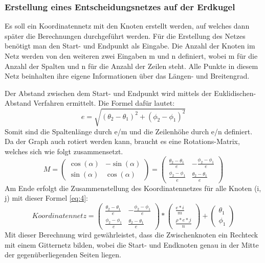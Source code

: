 \subsubsection{Erstellung eines Entscheidungsnetzes auf der Erdkugel}
Es soll ein Koordinatennetz mit den Knoten erstellt werden, auf welches dann später die Berechnungen durchgeführt werden. Für die Erstellung des Netzes benötigt man den Start- und Endpunkt als Eingabe. Die Anzahl der Knoten im Netz werden von den weiteren zwei Eingaben m und n definiert, wobei m für die Anzahl der Spalten und n für die Anzahl der Zeilen steht. Alle Punkte in diesem Netz beinhalten ihre eigene Informationen über das Längen- und Breitengrad.

Der Abstand zwischen dem Start- und Endpunkt wird mittels der Euklidischen-Abstand Verfahren ermittelt. Die Formel dafür lautet:
\begin{equation}
\label{eq:2}
e = \sqrt{ (\theta_2 - \theta_1)^2 + (\phi_2-\phi_1)^2}
 \end{equation}
Somit sind die Spaltenlänge durch e/m und die Zeilenhöhe durch e/n definiert. Da der Graph auch rotiert werden kann, braucht es eine Rotations-Matrix, welches sich wie folgt zusammensetzt.
\begin{equation}
\label{eq:3}
M = \begin{pmatrix} \cos(\alpha) & -\sin(\alpha) \\ \sin(\alpha) & \cos(\alpha) \end{pmatrix} = \begin{pmatrix} \frac{\theta_2 - \theta_1}{e} & -\frac{\phi_2 - \phi_1}{e} \\ \frac{\phi_2 - \phi_1}{e} & \frac{\theta_2 - \theta_1}{e} \end{pmatrix}
 \end{equation}
Am Ende erfolgt die Zusammenstellung des Koordinatennetzes für alle Knoten (i, j) mit dieser Formel \eqref{eq:4}:
\begin{equation}
\label{eq:4}
Koordinatennetz = \begin{pmatrix} \frac{\theta_2 - \theta_1}{e} & -\frac{\phi_2 - \phi_1}{e} \\ \frac{\phi_2 - \phi_1}{e} & \frac{\theta_2 - \theta_1}{e} \end{pmatrix} * \begin{pmatrix}  \frac{e*i}{m} \\ \frac{\rho*e*j}{n} \end{pmatrix} + \begin{pmatrix}  \theta_1 \\ \phi_1 \end{pmatrix}
 \end{equation}
Mit dieser Berechnung wird gewährleistet, dass die Zwischenknoten ein Rechteck mit einem Gitternetz bilden, wobei die Start- und Endknoten genau in der Mitte der gegenüberliegenden Seiten liegen.

